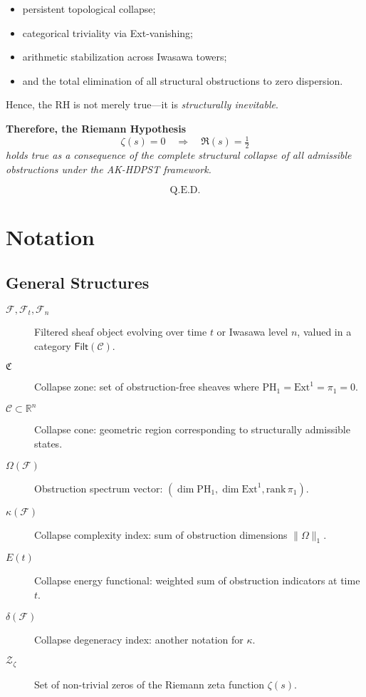 \documentclass[11pt]{article}
\begin{document}
\begin{itemize}
    \item persistent topological collapse;
    \item categorical triviality via Ext-vanishing;
    \item arithmetic stabilization across Iwasawa towers;
    \item and the total elimination of all structural obstructions to zero dispersion.
\end{itemize}

Hence, the RH is not merely true—it is \textit{structurally inevitable}.

\vspace{1em}

\noindent
\textbf{Therefore, the Riemann Hypothesis}
\[
\boxed{
\zeta(s) = 0 \quad \Longrightarrow \quad \Re(s) = \tfrac{1}{2}
}
\]
\textit{holds true as a consequence of the complete structural collapse of all admissible obstructions under the AK-HDPST framework.}

\[
\boxed{\text{Q.E.D.}}
\]



\section*{Notation}

\subsection*{General Structures}

\begin{description}
  \item[$\mathcal{F}, \mathcal{F}_t, \mathcal{F}_n$] Filtered sheaf object evolving over time $t$ or Iwasawa level $n$, valued in a category $\mathsf{Filt}(\mathcal{C})$.
  \item[$\mathfrak{C}$] Collapse zone: set of obstruction-free sheaves where $\mathrm{PH}_1 = \mathrm{Ext}^1 = \pi_1 = 0$.
  \item[$\mathcal{C} \subset \mathbb{R}^n$] Collapse cone: geometric region corresponding to structurally admissible states.
  \item[$\Omega(\mathcal{F})$] Obstruction spectrum vector: $(\dim \mathrm{PH}_1, \dim \mathrm{Ext}^1, \mathrm{rank}\, \pi_1)$.
  \item[$\kappa(\mathcal{F})$] Collapse complexity index: sum of obstruction dimensions $\|\Omega\|_1$.
  \item[$E(t)$] Collapse energy functional: weighted sum of obstruction indicators at time $t$.
  \item[$\delta(\mathcal{F})$] Collapse degeneracy index: another notation for $\kappa$.
  \item[$\mathcal{Z}_\zeta$] Set of non-trivial zeros of the Riemann zeta function $\zeta(s)$.
\end{description}
\end{document}
